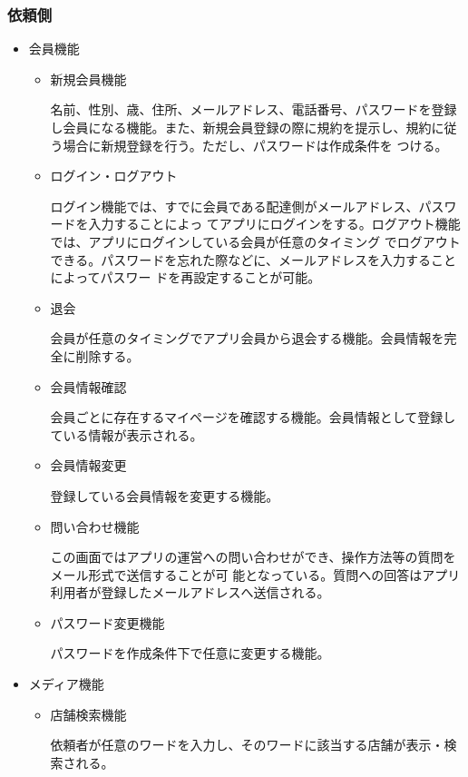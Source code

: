 \subsubsection{依頼側}

\begin{itemize}
  \item 会員機能
    \begin{itemize}
        \item 新規会員機能
        
        名前、性別、歳、住所、メールアドレス、電話番号、パスワードを登録し会員になる機能。また、新規会員登録の際に規約を提示し、規約に従う場合に新規登録を行う。ただし、パスワードは作成条件を つける。
        \item ログイン・ログアウト
        
        ログイン機能では、すでに会員である配達側がメールアドレス、パスワードを入力することによっ てアプリにログインをする。ログアウト機能では、アプリにログインしている会員が任意のタイミング でログアウトできる。パスワードを忘れた際などに、メールアドレスを入力することによってパスワー ドを再設定することが可能。
        \item 退会
        
        会員が任意のタイミングでアプリ会員から退会する機能。会員情報を完全に削除する。
        \item 会員情報確認

        会員ごとに存在するマイページを確認する機能。会員情報として登録している情報が表示される。
        \item 会員情報変更
        
        登録している会員情報を変更する機能。
        \item 問い合わせ機能
        
        この画面ではアプリの運営への問い合わせができ、操作方法等の質問をメール形式で送信することが可 能となっている。質問への回答はアプリ利用者が登録したメールアドレスへ送信される。
        \item パスワード変更機能
        
        パスワードを作成条件下で任意に変更する機能。

    \end{itemize}

  \item メディア機能
    \begin{itemize}
        \item 店舗検索機能
        
        依頼者が任意のワードを入力し、そのワードに該当する店舗が表示・検索される。
        

\end{itemize}
\end{itemize}
